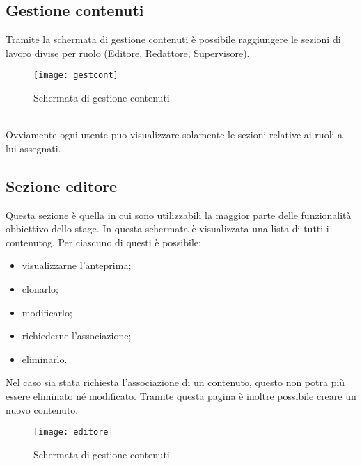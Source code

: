 \subsection{Gestione contenuti}
Tramite la schermata di gestione contenuti è possibile raggiungere le sezioni di lavoro divise per ruolo (Editore, Redattore, Supervisore).
\begin{figure}[h]
    \begin{center}
    \texttt{[image: gestcont]}
    \caption{Schermata di gestione contenuti}
    \label{fig:figure22}
    \end{center}
\end{figure}
\\Ovviamente ogni utente puo visualizzare solamente le sezioni relative ai ruoli a lui assegnati.

\subsection{Sezione editore}
Questa sezione è quella in cui sono utilizzabili la maggior parte delle funzionalità obbiettivo dello stage. In questa schermata è visualizzata una lista di tutti i \gls{contenutog}. Per ciascuno di questi è possibile:
\begin{itemize}
    \item visualizzarne l'anteprima;
    \item clonarlo;
    \item modificarlo;
    \item richiederne l'associazione;
    \item eliminarlo.
\end{itemize}
Nel caso sia stata richiesta l'associazione di un contenuto, questo non potra più essere eliminato né modificato.
Tramite questa pagina è inoltre possibile creare un nuovo contenuto.
\begin{figure}[h]
    \begin{center}
    \texttt{[image: editore]}
    \caption{Schermata di gestione contenuti}
    \label{fig:figure23}
    \end{center}
\end{figure}

